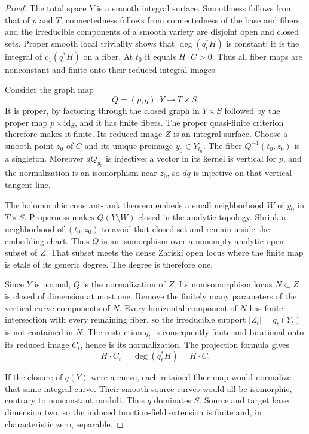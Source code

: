 \begin{proof}
The total space $Y$ is a smooth integral surface. Smoothness
follows from that of $p$ and $T$; connectedness follows from
connectedness of the base and fibers, and the irreducible
components of a smooth variety are disjoint open and closed
sets. Proper smooth local triviality shows that
$\deg(q_t^*H)$ is constant: it is the integral of $c_1(q^*H)$
on a fiber. At $t_0$ it equals $H\cdot C>0$. Thus all fiber
maps are nonconstant and finite onto their reduced integral
images.

Consider the graph map
\[
Q=(p,q):Y\longrightarrow T\times S.
\]
It is proper, by factoring through the closed graph in
$Y\times S$ followed by the proper map $p\times\mathrm{id}_S$,
and it has finite fibers. The proper quasi-finite criterion
therefore makes it finite. Its reduced image $Z$ is an integral
surface.
Choose a smooth point $z_0$ of $C$ and its unique preimage
$y_0\in Y_{t_0}$. The fiber $Q^{-1}(t_0,z_0)$ is a singleton.
Moreover $dQ_{y_0}$ is injective: a vector in its kernel is
vertical for $p$, and the normalization is an isomorphism near
$z_0$, so $dq$ is injective on that vertical tangent line.

The holomorphic constant-rank theorem embeds a small
neighborhood $W$ of $y_0$ in $T\times S$. Properness makes
$Q(Y\setminus W)$ closed in the analytic topology. Shrink a neighborhood
of $(t_0,z_0)$ to avoid that closed set and remain inside the
embedding chart. Thus $Q$ is an isomorphism over a nonempty
analytic open subset of $Z$. That subset meets the dense
Zariski open locus where the finite map is etale of its generic
degree. The degree is therefore one.

Since $Y$ is normal, $Q$ is the normalization of $Z$. Its
nonisomorphism locus $N\subset Z$ is closed of dimension at
most one. Remove the finitely many parameters of the vertical
curve components of $N$. Every horizontal component of $N$
has finite intersection with every remaining fiber, so the
irreducible support
$|Z_t|=q_t(Y_t)$ is not contained in $N$. The restriction $q_t$
is consequently finite and birational onto its reduced image
$C_t$, hence is its normalization. The projection formula gives
\[
H\cdot C_t=\deg(q_t^*H)=H\cdot C.
\]

If the closure of $q(Y)$ were a curve, each retained fiber map
would normalize that same integral curve. Their smooth source
curves would all be isomorphic, contrary to nonconstant moduli.
Thus $q$ dominates $S$. Source and target have dimension two,
so the induced function-field extension is finite and, in
characteristic zero, separable.


\end{proof}
